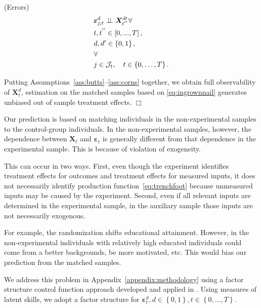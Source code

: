\renewcommand\theassumption{A--\arabic{assumption}}
\begin{assumption}\label{ass:corns} (Errors)
\begin{align*}
&\bm{\varepsilon}^d_{j,t} \perp\!\!\!\perp \bm{X}^{d \prime}_{t^{''}} \forall \\
&t,t^{''} \in \left[ 0,...,T \right], \\
&d,d^{\prime} \in \left\{ 0,1 \right\}, \\
&\forall \\
&j \in \mathcal{J}_t, \quad t \in \left\{0,\dots,T\right\}.
\end{align*}
\end{assumption}

\begin{theorem}
Putting Assumptions~\ref{ass:butts}--\ref{ass:corns} together, we obtain full observability of $\bm{X}^d_t$, estimation on the matched samples based on \eqref{eq:ingrownnail} generates unbiased out of sample treatment effects. $\Box$
\end{theorem}

Our prediction is based on matching individuals in the non-experimental samples to the control-group individuals. In the non-experimental samples, however, the dependence between $\bm{X}_{t}$ and $\bm{\varepsilon}_{t}$ is generally different from that dependence in the experimental sample. This is because of violation of exogeneity.

This can occur in two ways. First, even though the experiment identifies treatment effects for outcomes and treatment effects for measured inputs, it does not necessarily identify production function~\eqref{eq:trenchfoot} because unmeasured inputs may be caused by the experiment. Second, even if all relevant inputs are determined in the experimental sample, in the auxiliary sample those inputs are not necessarily exogenous.

For example, the randomization shifts educational attainment. However, in the non-experimental individuals with relatively high educated individuals could come from a better backgrounds, be more motivated, etc. This would bias our prediction from the matched samples.

We address this problem in Appendix~\ref{appendix:methodology} using a factor structure control function approach developed and applied in \citet{Heckman_Pinto_etal_2013_PerryFactor}. Using measures of latent skills, we adopt a factor structure for $\bm{\varepsilon}^d_t, d \in \left\{0,1\right\}, t \in \left\{0,...,T\right\}$.


